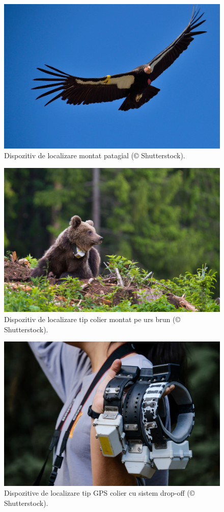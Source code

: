 \documentclass[11pt,onehalfspacing]{elife}
\begin{document}
\begin{figure}[ht]
\includegraphics[width=\textwidth]{Fig9.jpg}
\caption{Dispozitiv de localizare montat patagial (© Shutterstock).} \label{fig9}
\end{figure}
\begin{figure}[ht]
\includegraphics[width=\textwidth]{Fig10.jpg}
\caption{Dispozitiv de localizare tip colier montat pe urs brun (© Shutterstock).} \label{fig10}
\end{figure}
\begin{figure}[ht]
\includegraphics[width=\textwidth]{Fig11.jpg}
\caption{Dispozitive de localizare tip GPS colier cu sistem drop-off (© Shutterstock).} \label{fig11}
\end{figure}
\end{document}
